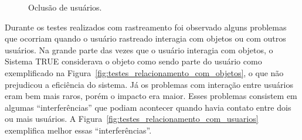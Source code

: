 		\begin{figure}[htb]
		\begin{center}
			\end{center}
			\caption{Oclusão de usuários.}
			\label{fig:testes_oclusao}
		\end{figure}
		
	Durante os testes realizados com rastreamento foi observado alguns problemas que ocorriam quando o usuário rastreado interagia com objetos ou com outros usuários. Na grande parte das vezes que o usuário interagia com objetos, o Sistema TRUE considerava o objeto como sendo parte do usuário como exemplificado na Figura~\ref{fig:testes_relacionamento_com_objetos}, o que não prejudicou a eficiência do sistema. Já os problemas com interação entre usuários eram bem mais raros, porém o impacto era maior. Esses problemas consistem em algumas ``interferências'' que podiam acontecer quando havia contato entre dois ou mais usuários. A Figura~\ref{fig:testes_relacionamento_com_usuarios} exemplifica melhor essas ``interferências''.
	
